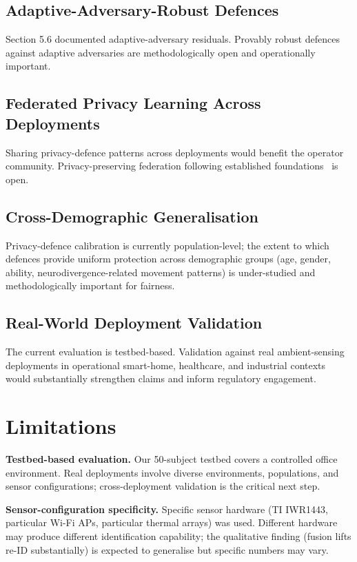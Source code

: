 \documentclass[sigconf,nonacm]{acmart}
\begin{document}
\subsection{Adaptive-Adversary-Robust Defences}

Section 5.6 documented adaptive-adversary residuals. Provably
robust defences against adaptive adversaries are
methodologically open and operationally important.

\subsection{Federated Privacy Learning Across Deployments}

Sharing privacy-defence patterns across deployments would benefit
the operator community. Privacy-preserving federation following
established foundations~\cite{kairouz2024fedml} is open.

\subsection{Cross-Demographic Generalisation}

Privacy-defence calibration is currently population-level; the
extent to which defences provide uniform protection across
demographic groups (age, gender, ability, neurodivergence-related
movement patterns) is under-studied and methodologically
important for fairness.

\subsection{Real-World Deployment Validation}

The current evaluation is testbed-based. Validation against real
ambient-sensing deployments in operational smart-home, healthcare,
and industrial contexts would substantially strengthen claims and
inform regulatory engagement.

\section{Limitations}

\textbf{Testbed-based evaluation.} Our 50-subject testbed
covers a controlled office environment. Real deployments
involve diverse environments, populations, and sensor
configurations; cross-deployment validation is the
critical next step.

\textbf{Sensor-configuration specificity.} Specific sensor
hardware (TI IWR1443, particular Wi-Fi APs, particular thermal
arrays) was used. Different hardware may produce
different identification capability; the qualitative finding
(fusion lifts re-ID substantially) is expected to generalise but
specific numbers may vary.
\end{document}
